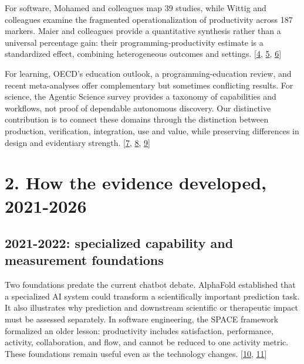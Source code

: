For software, Mohamed and colleagues map 39 studies, while Wittig and colleagues examine the fragmented operationalization of productivity across 187 markers. Maier and colleagues provide a quantitative synthesis rather than a universal percentage gain: their programming-productivity estimate is a standardized effect, combining heterogeneous outcomes and settings. [\hyperlink{ref-ref-59e035c44a}{4}, \hyperlink{ref-wittig2026}{5}, \hyperlink{ref-maier2026}{6}]


For learning, OECD's education outlook, a programming-education review, and recent meta-analyses offer complementary but sometimes conflicting results. For science, the Agentic Science survey provides a taxonomy of capabilities and workflows, not proof of dependable autonomous discovery. Our distinctive contribution is to connect these domains through the distinction between production, verification, integration, use and value, while preserving differences in design and evidentiary strength. [\hyperlink{ref-oecdeducation2026}{7}, \hyperlink{ref-ref-e71e370e4c}{8}, \hyperlink{ref-agenticsurvey2025}{9}]



\section*{2. How the evidence developed, 2021-2026}

\subsection*{2021-2022: specialized capability and measurement foundations}
Two foundations predate the current chatbot debate. AlphaFold established that a specialized AI system could transform a scientifically important prediction task. It also illustrates why prediction and downstream scientific or therapeutic impact must be assessed separately. In software engineering, the SPACE framework formalized an older lesson: productivity includes satisfaction, performance, activity, collaboration, and flow, and cannot be reduced to one activity metric. These foundations remain useful even as the technology changes. [\hyperlink{ref-alphafold2021}{10}, \hyperlink{ref-space2021}{11}]



